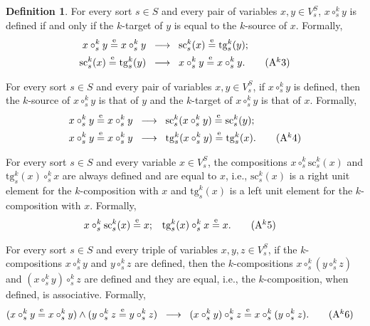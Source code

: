 \documentclass{amsart}
\theoremstyle{plain}
\theoremstyle{definition}
\newtheorem{definition}[theorem]{Definition}
\begin{document}
\begin{definition}
For every sort $s\in S$ and every pair of variables $x,y\in V^{S}_{s}$, $x\circ^{k}_{s} y$ is defined if and only if the $k$-target of $y$ is equal to the $k$-source of $x$. Formally,
\allowdisplaybreaks
\begin{align*}
x\circ^{k}_{s} y\overset{\mathrm{e}}{=}x\circ^{k}_{s} y \;\;
&\longrightarrow \;\;
\mathrm{sc}^{k}_{s}(x)\overset{\mathrm{e}}{=}\mathrm{tg}^{k}_{s}(y);\\
\mathrm{sc}^{k}_{s}(x)\overset{\mathrm{e}}{=}\mathrm{tg}^{k}_{s}(y) \;\;
&\longrightarrow \;\;
x\circ^{k}_{s} y\overset{\mathrm{e}}{=}x\circ^{k}_{s}y.\label{DVarCompactAk3}\tag{A$^{k}$3}
\end{align*}

For every sort $s\in S$ and every pair of variables $x,y\in V^{S}_{s}$, if $x\circ^{k}_{s} y$ is defined, then the $k$-source of $x\circ^{k}_{s}y$ is that of $y$ and the $k$-target of $x\circ^{k}_{s}y$ is that of $x$. Formally,
\allowdisplaybreaks
\begin{align*}
x\circ^{k}_{s}y\overset{\mathrm{e}}{=}x\circ^{k}_{s}y \;\;
&\longrightarrow \;\;
\mathrm{sc}^{k}_{s}(x\circ^{k}_{s}y)\overset{\mathrm{e}}{=}\mathrm{sc}^{k}_{s}(y);\\
x\circ^{k}_{s}y\overset{\mathrm{e}}{=}x\circ^{k}_{s}y \;\;
&\longrightarrow \;\;
\mathrm{tg}^{k}_{s}(x\circ^{k}_{s}y)\overset{\mathrm{e}}{=}\mathrm{tg}^{k}_{s}(x).\label{DVarCompactAk4}\tag{A$^{k}$4}
\end{align*}

For every sort $s\in S$ and every variable $x\in V^{S}_{s}$, the compositions $x\circ^{k}_{s}\mathrm{sc}^{k}_{s}(x)$ and $\mathrm{tg}^{k}_{s}(x)\circ^{k}_{s}x$ are always defined and are equal to $x$, i.e., $\mathrm{sc}^{k}_{s}(x)$ is a right unit element for the $k$-composition with $x$ and $\mathrm{tg}^{k}_{s}(x)$ is a left unit element for the $k$-composition with $x$. Formally,
\allowdisplaybreaks
\begin{align*}
x\circ^{k}_{s}\mathrm{sc}^{k}_{s}(x)&\overset{\mathrm{e}}{=} x;
&
\mathrm{tg}^{k}_{s}(x)\circ^{k}_{s}x&\overset{\mathrm{e}}{=} x.\label{DVarCompactAk5}\tag{A$^{k}$5}
\end{align*}

For every sort $s\in S$ and every triple of variables $x, y, z\in V^{S}_{s}$, if the $k$-compositions $x\circ^{k}_{s}y$ and $y\circ^{k}_{s}z$ are defined, then the $k$-compositions $x\circ^{k}_{s}(y\circ^{k}_{s}z)$ and $(x\circ^{k}_{s}y)\circ^{k}_{s}z$ are defined and they are equal, i.e., the $k$-composition, when defined, is associative. Formally,
\allowdisplaybreaks
\begin{align*}
(x\circ^{k}_{s}y\overset{\mathrm{e}}{=} x\circ^{k}_{s}y)
\wedge
(y\circ^{k}_{s}z\overset{\mathrm{e}}{=} y\circ^{k}_{s}z)\;\;
&\longrightarrow \;\;
(x\circ^{k}_{s}y)\circ^{k}_{s}z\overset{\mathrm{e}}{=} x\circ^{k}_{s}(y\circ^{k}_{s}z).\label{DVarCompactAk6}\tag{A$^{k}$6}
\end{align*}


\end{definition}
\end{document}
